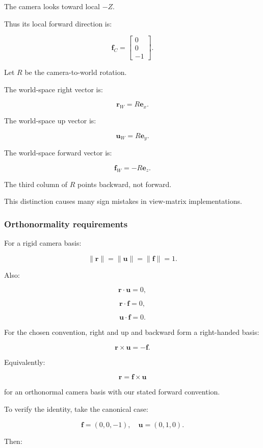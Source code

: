 The camera looks toward local \(-Z\).

Thus its local forward direction is:

\[
 \boxed{ \mathbf f_C= \begin{bmatrix}0\\0\\-1\end{bmatrix} }.
\]

Let \(R\) be the camera-to-world rotation.

The world-space right vector is:

\[
 \boxed{ \mathbf r_W=R\mathbf e_x }.
\]

The world-space up vector is:

\[
 \boxed{ \mathbf u_W=R\mathbf e_y }.
\]

The world-space forward vector is:

\[
 \boxed{ \mathbf f_W=-R\mathbf e_z }.
\]

The third column of \(R\) points backward, not forward.

This distinction causes many sign mistakes in view-matrix implementations.

\subsubsection{Orthonormality requirements}\label{02-foundations-ii-ch032-orthonormality-requirements}

For a rigid camera basis:

\[
 \|\mathbf r\|=\|\mathbf u\|=\|\mathbf f\|=1.
\]

Also:

\[
 \mathbf r\cdot\mathbf u=0,
\]

\[
 \mathbf r\cdot\mathbf f=0,
\]

\[
 \mathbf u\cdot\mathbf f=0.
\]

For the chosen convention, right and up and backward form a right-handed basis:

\[
 \mathbf r\times\mathbf u=-\mathbf f.
\]

Equivalently:

\[
 \mathbf r=\mathbf f\times\mathbf u
\]

for an orthonormal camera basis with our stated forward convention.

To verify the identity, take the canonical case:

\[
 \mathbf f=(0,0,-1),\quad \mathbf u=(0,1,0).
\]

Then:

